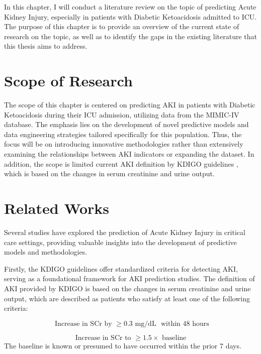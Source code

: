 \documentclass[../main.tex]{subfiles}
\begin{document}
\par In this chapter, I will conduct a literature review on the topic of predicting Acute Kidney Injury, especially in patients with Diabetic Ketoacidosis admitted to ICU.
The purpose of this chapter is to provide an overview of the current state of research on the topic, as well as to identify the gaps in the existing literature that this thesis aims to address.


\section{Scope of Research}
The scope of this chapter is centered on predicting AKI in patients with Diabetic Ketoacidosis  during their ICU admission, utilizing data from the MIMIC-IV database.
The emphasis lies on the development of novel predictive models and data engineering strategies tailored specifically for this population.
Thus, the focus will be on introducing innovative methodologies rather than extensively examining the relationships between AKI indicators or expanding the dataset.
In addition, the scope is limited current AKI definition by KDIGO guidelines \cite{kdigo-aki-guideline}, which is based on the changes in serum creatinine and urine output.


\section{Related Works}

Several studies have explored the prediction of Acute Kidney Injury in critical care settings, providing valuable insights into the development of predictive models and methodologies.

Firstly, the KDIGO guidelines \cite{kdigo-aki-guideline} offer standardized criteria for detecting AKI, serving as a foundational framework for AKI prediction studies.
The definition of AKI provided by KDIGO is based on the changes in serum creatinine and urine output, which are described as patients who satisfy at least one of the following criteria:

\begin{equation}
    \text{ Increase in SCr by } \geq 0.3 \text{ mg/dL } \text{ within 48 hours}
\end{equation}

\begin{equation}
    \text{ Increase in SCr to } \geq 1.5 \times \text{ baseline }
\end{equation}
The baseline is known or presumed to have occurred within the prior 7 days.
\end{document}

